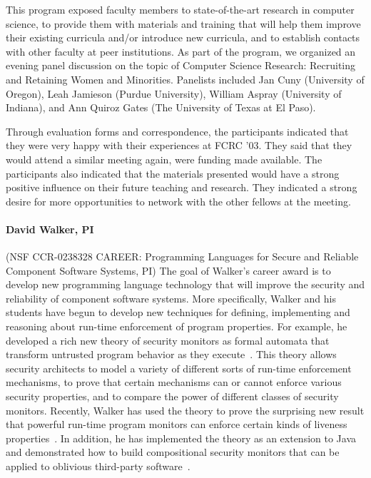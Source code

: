\documentclass[11pt]{article}
\begin{document}
This program exposed faculty members to state-of-the-art research in
computer science, to provide them with materials and training that
will help them improve their existing curricula and/or introduce new
curricula, and to establish contacts with other faculty at peer
institutions.  As part of the program, we organized an evening panel
discussion on the topic of Computer Science Research: Recruiting and
Retaining Women and Minorities.  Panelists included Jan Cuny
(University of Oregon), Leah Jamieson (Purdue University), William
Aspray (University of Indiana), and Ann Quiroz Gates (The University
of Texas at El Paso).  

Through evaluation forms and correspondence, the participants
indicated that they were very happy with their experiences at
FCRC '03. They said that they would attend a similar meeting again,
were funding made available. The participants also indicated that the
materials presented would have a strong positive influence on their
future teaching and research.  They indicated a strong desire for more
opportunities to network with the other fellows at the meeting.

%

\paragraph*{David Walker, PI} (NSF CCR-0238328 CAREER: Programming Languages for Secure and Reliable Component Software
Systems, PI)
The goal of Walker's career award is to develop new programming language
technology that will improve the security and reliability of component software systems.
More specifically, Walker and his students have begun to develop new techniques for defining,
implementing and reasoning about run-time enforcement of program properties.
For example, he developed a rich new theory of security monitors as formal
automata that transform untrusted program behavior as they 
execute~\cite{ligatti+:edit-automata}.
This theory allows security
architects to model a variety of different sorts of run-time
enforcement mechanisms, to prove that certain mechanisms can or cannot
enforce various security properties, and to compare the power of
different classes of security monitors.    Recently, Walker 
has used the theory to prove the surprising new result that powerful run-time
program monitors can enforce certain kinds of liveness properties~\cite{ligatti+:renewal}.  
In addition, he has implemented the theory as an extension to Java and demonstrated
how to build compositional security monitors that can be applied to oblivious third-party 
software~\cite{bauer+:polymer}.
\end{document}
